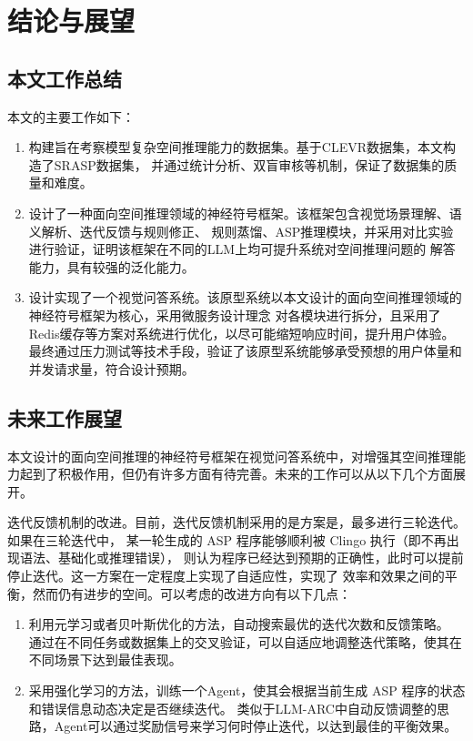 \chapter{结论与展望}
\section{本文工作总结}
本文的主要工作如下：
\begin{enumerate}[itemsep=0pt,parsep=0pt]
\item 构建旨在考察模型复杂空间推理能力的数据集。基于CLEVR数据集，本文构造了SRASP数据集，
并通过统计分析、双盲审核等机制，保证了数据集的质量和难度。
\item 设计了一种面向空间推理领域的神经符号框架。该框架包含视觉场景理解、语义解析、迭代反馈与规则修正、
规则蒸馏、ASP推理模块，并采用对比实验进行验证，证明该框架在不同的LLM上均可提升系统对空间推理问题的
解答能力，具有较强的泛化能力。
\item 设计实现了一个视觉问答系统。该原型系统以本文设计的面向空间推理领域的神经符号框架为核心，采用微服务设计理念
对各模块进行拆分，且采用了Redis缓存等方案对系统进行优化，以尽可能缩短响应时间，提升用户体验。
最终通过压力测试等技术手段，验证了该原型系统能够承受预想的用户体量和并发请求量，符合设计预期。
\end{enumerate}
\section{未来工作展望}
本文设计的面向空间推理的神经符号框架在视觉问答系统中，对增强其空间推理能力起到了积极作用，但仍有许多方面有待完善。未来的工作可以从以下几个方面展开。

迭代反馈机制的改进。目前，迭代反馈机制采用的是方案是，最多进行三轮迭代。如果在三轮迭代中，
某一轮生成的 ASP 程序能够顺利被 Clingo 执行（即不再出现语法、基础化或推理错误），
则认为程序已经达到预期的正确性，此时可以提前停止迭代。这一方案在一定程度上实现了自适应性，实现了
效率和效果之间的平衡，然而仍有进步的空间。可以考虑的改进方向有以下几点：
\begin{enumerate}[itemsep=0pt,parsep=0pt]
    \item 利用元学习或者贝叶斯优化的方法，自动搜索最优的迭代次数和反馈策略。
通过在不同任务或数据集上的交叉验证，可以自适应地调整迭代策略，使其在不同场景下达到最佳表现。
    \item 采用强化学习的方法，训练一个Agent，使其会根据当前生成 ASP 程序的状态和错误信息动态决定是否继续迭代。
类似于LLM-ARC中自动反馈调整的思路，Agent可以通过奖励信号来学习何时停止迭代，以达到最佳的平衡效果\cite{kalyanpur2024llmarcenhancingllmsautomated}。
\end{enumerate}

